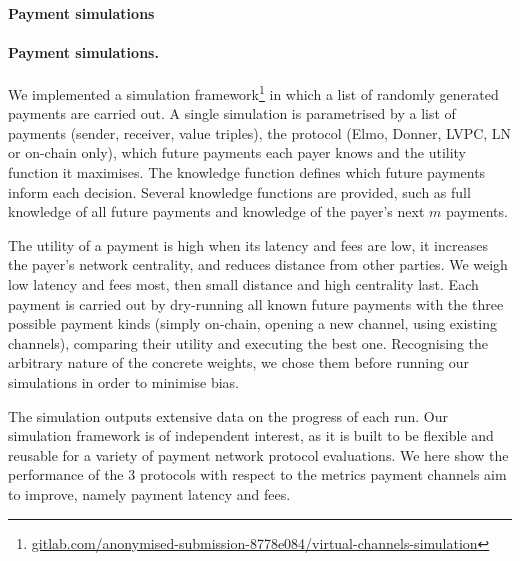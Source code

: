   \makeatletter%
    {\paragraph{Payment simulations}}%
    {\paragraph{Payment simulations.}}%
  \makeatother%
  We implemented a simulation
  framework\footnote{\url{gitlab.com/anonymised-submission-8778e084/virtual-channels-simulation}}
  in which a list of randomly generated payments are carried out.
  A single simulation is parametrised by a list of payments
  (sender, receiver, value triples), the protocol (Elmo, Donner, LVPC, LN or
  on-chain only), which future payments each payer knows and the utility
  function it maximises. The knowledge function defines which future payments
  inform each decision. Several knowledge functions are provided, such as full
  knowledge of all future payments and knowledge of the payer's next $m$
  payments.

  The utility of a payment is high when its latency and fees are
  low, it increases the payer's network centrality, and reduces
  distance from other parties. We weigh low latency
  and fees most, then small distance and high centrality last.
  Each payment is carried out by dry-running all known future
  payments with the three possible payment kinds (simply
  on-chain, opening a new channel, using existing
  channels), comparing their utility and executing the best one.
  Recognising the arbitrary nature of the concrete weights, we
  chose them before running our simulations in order to minimise
  bias.

  The simulation outputs extensive data on the progress of each run. Our
  simulation framework is of independent interest, as it is built to be flexible
  and reusable for a variety of payment network protocol evaluations. We here
  show the performance of the $3$ protocols with respect to the metrics payment
  channels aim to improve, namely payment latency and fees.

